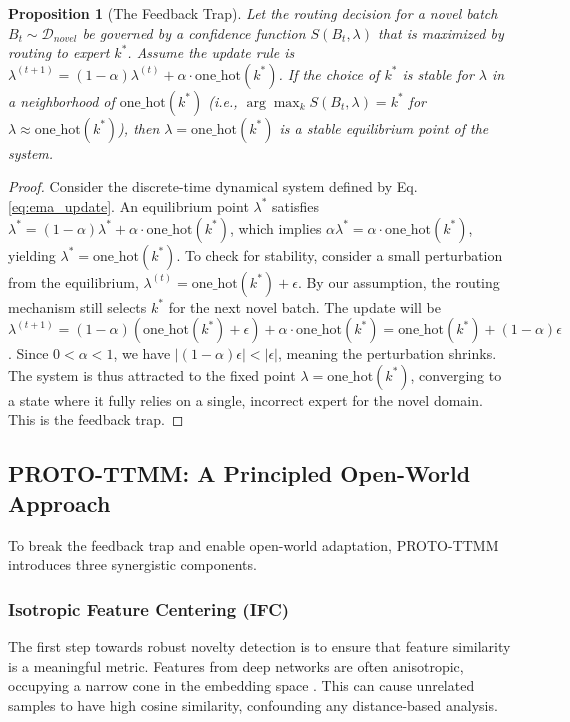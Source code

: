 \documentclass[twoside]{article}
\newtheorem{proposition}{Proposition}
\begin{document}
\begin{proposition}[The Feedback Trap]
Let the routing decision for a novel batch $B_t \sim \mathcal{D}_{novel}$ be governed by a confidence function $S(B_t, \lambda)$ that is maximized by routing to expert $k^*$. Assume the update rule is $\lambda^{(t+1)} = (1-\alpha)\lambda^{(t)} + \alpha \cdot \text{one\_hot}(k^*)$. If the choice of $k^*$ is stable for $\lambda$ in a neighborhood of $\text{one\_hot}(k^*)$ (i.e., $\arg\max_k S(B_t, \lambda) = k^*$ for $\lambda \approx \text{one\_hot}(k^*)$), then $\lambda = \text{one\_hot}(k^*)$ is a stable equilibrium point of the system.
\end{proposition}
\begin{proof}
Consider the discrete-time dynamical system defined by Eq. \ref{eq:ema_update}. An equilibrium point $\lambda^*$ satisfies $\lambda^* = (1-\alpha)\lambda^* + \alpha \cdot \text{one\_hot}(k^*)$, which implies $\alpha\lambda^* = \alpha \cdot \text{one\_hot}(k^*)$, yielding $\lambda^* = \text{one\_hot}(k^*)$.
To check for stability, consider a small perturbation from the equilibrium, $\lambda^{(t)} = \text{one\_hot}(k^*) + \epsilon$. By our assumption, the routing mechanism still selects $k^*$ for the next novel batch. The update will be $\lambda^{(t+1)} = (1-\alpha)(\text{one\_hot}(k^*) + \epsilon) + \alpha \cdot \text{one\_hot}(k^*) = \text{one\_hot}(k^*) + (1-\alpha)\epsilon$. Since $0 < \alpha < 1$, we have $|(1-\alpha)\epsilon| < |\epsilon|$, meaning the perturbation shrinks. The system is thus attracted to the fixed point $\lambda = \text{one\_hot}(k^*)$, converging to a state where it fully relies on a single, incorrect expert for the novel domain. This is the feedback trap.
\end{proof}

\subsection{PROTO-TTMM: A Principled Open-World Approach}

To break the feedback trap and enable open-world adaptation, PROTO-TTMM introduces three synergistic components.

\subsubsection{Isotropic Feature Centering (IFC)}

The first step towards robust novelty detection is to ensure that feature similarity is a meaningful metric. Features from deep networks are often anisotropic, occupying a narrow cone in the embedding space \cite{wang2020understanding}. This can cause unrelated samples to have high cosine similarity, confounding any distance-based analysis.
\end{document}
